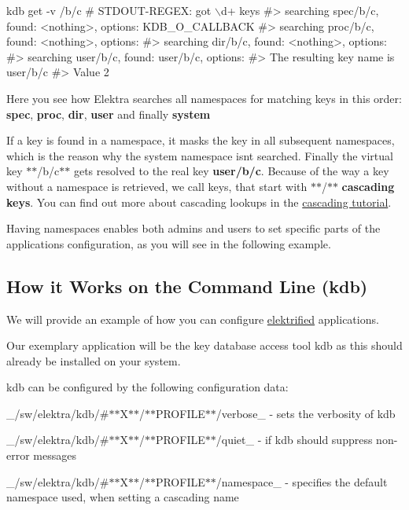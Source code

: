 \begin{DoxyCode}
kdb get -v /b/c
# STDOUT-REGEX: got \(\backslash\)d+ keys
#>  searching spec/b/c, found: <nothing>, options: KDB\_O\_CALLBACK
#>  searching proc/b/c, found: <nothing>, options:
#>  searching dir/b/c, found: <nothing>, options:
#>  searching user/b/c, found: user/b/c, options:
#> The resulting key name is user/b/c
#> Value 2
\end{DoxyCode}


Here you see how Elektra searches all namespaces for matching keys in this order\+: {\bfseries spec}, {\bfseries proc}, {\bfseries dir}, {\bfseries user} and finally {\bfseries system}

If a key is found in a namespace, it masks the key in all subsequent namespaces, which is the reason why the system namespace isn\textquotesingle{}t searched. Finally the virtual key $\ast$$\ast$/b/c$\ast$$\ast$ gets resolved to the real key {\bfseries user/b/c}. Because of the way a key without a namespace is retrieved, we call keys, that start with \textquotesingle{}$\ast$$\ast$/$\ast$$\ast$\textquotesingle{} {\bfseries cascading keys}. You can find out more about cascading lookups in the \hyperlink{doc_tutorials_cascading_md}{cascading tutorial}.

Having namespaces enables both admins and users to set specific parts of the application\textquotesingle{}s configuration, as you will see in the following example.

\subsection*{How it Works on the Command Line (kdb)}

We will provide an example of how you can configure \hyperlink{doc_help_elektra-glossary_md}{elektrified} applications.

Our exemplary application will be the key database access tool {\ttfamily kdb} as this should already be installed on your system.

{\ttfamily kdb} can be configured by the following configuration data\+:


\begin{DoxyItemize}
\item \+\_\+/sw/elektra/kdb/\#$\ast$$\ast$\+X$\ast$$\ast$/$\ast$$\ast$\+P\+R\+O\+F\+I\+L\+E$\ast$$\ast$/verbose\+\_\+ -\/ sets the verbosity of kdb
\item \+\_\+/sw/elektra/kdb/\#$\ast$$\ast$\+X$\ast$$\ast$/$\ast$$\ast$\+P\+R\+O\+F\+I\+L\+E$\ast$$\ast$/quiet\+\_\+ -\/ if kdb should suppress non-\/error messages
\item \+\_\+/sw/elektra/kdb/\#$\ast$$\ast$\+X$\ast$$\ast$/$\ast$$\ast$\+P\+R\+O\+F\+I\+L\+E$\ast$$\ast$/namespace\+\_\+ -\/ specifies the default namespace used, when setting a cascading name
\end{DoxyItemize}

